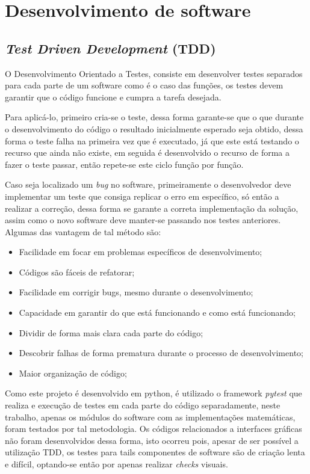 \section{Desenvolvimento de software}

\subsection{\textit{Test Driven Development} (TDD)}

O  Desenvolvimento Orientado a Testes, consiste em desenvolver testes separados para cada parte de um software como é o caso das funções, os testes devem garantir que o código funcione e cumpra a tarefa desejada.

Para aplicá-lo, primeiro cria-se o teste, dessa forma garante-se que o que durante o desenvolvimento do código o resultado inicialmente esperado seja obtido, dessa forma o teste falha na primeira vez que é executado, já que este está testando o recurso que ainda não existe, em seguida é desenvolvido o recurso de forma a fazer o teste passar, então repete-se este ciclo função por função. 

Caso seja localizado um \textit{bug} no software, 
primeiramente o desenvolvedor deve implementar um teste que consiga replicar o erro em específico, só então a realizar a correção, dessa forma se garante a correta implementação da solução, assim como o novo software deve manter-se passando nos testes anteriores. Algumas das vantagem de tal método são:
\begin{itemize}
    \item Facilidade em focar em problemas específicos de desenvolvimento;
    \item Códigos são fáceis de refatorar;
    \item Facilidade em corrigir bugs, mesmo durante o desenvolvimento;
    \item Capacidade em garantir do que está funcionando e como está funcionando;
    \item Dividir de forma mais clara cada parte do código; 
    \item Descobrir falhas de forma prematura durante o processo de desenvolvimento;
    \item Maior organização de código;
\end{itemize}

Como este projeto é desenvolvido em python, 
é utilizado o framework \textit{pytest} que realiza e execução de testes em cada parte do código separadamente, 
neste trabalho, apenas os módulos do software com as implementações matemáticas, 
foram testados por tal metodologia.
Os códigos relacionados a interfaces gráficas não foram desenvolvidos dessa forma, 
isto ocorreu pois, apesar de ser possível a utilização TDD, 
os testes para tails componentes de software são de criação lenta e difícil, 
optando-se então por apenas realizar \textit{checks} visuais.

